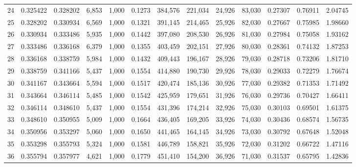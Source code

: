 \begin{tabular}{rrrrrrrrrrrrr}
24  &  0.325422 &  0.328202 &   6,853 &  1,000 &                                     0.1273 &  384,576 &  221,034 &   24,926 &   83,030 &  0.27307 &  0.76911 &  2.04745 \\
25  &  0.328202 &  0.330934 &   6,569 &  1,000 &                                     0.1321 &  391,145 &  214,465 &   25,926 &   82,030 &  0.27667 &  0.75985 &  1.98660 \\
26  &  0.330934 &  0.333486 &   5,935 &  1,000 &                                     0.1442 &  397,080 &  208,530 &   26,926 &   81,030 &  0.27984 &  0.75058 &  1.93162 \\
27  &  0.333486 &  0.336168 &   6,379 &  1,000 &                                     0.1355 &  403,459 &  202,151 &   27,926 &   80,030 &  0.28361 &  0.74132 &  1.87253 \\
28  &  0.336168 &  0.338759 &   5,984 &  1,000 &                                     0.1432 &  409,443 &  196,167 &   28,926 &   79,030 &  0.28718 &  0.73206 &  1.81710 \\
29  &  0.338759 &  0.341166 &   5,437 &  1,000 &                                     0.1554 &  414,880 &  190,730 &   29,926 &   78,030 &  0.29033 &  0.72279 &  1.76674 \\
30  &  0.341167 &  0.343664 &   5,594 &  1,000 &                                     0.1517 &  420,474 &  185,136 &   30,926 &   77,030 &  0.29382 &  0.71353 &  1.71492 \\
31  &  0.343664 &  0.346114 &   5,485 &  1,000 &                                     0.1542 &  425,959 &  179,651 &   31,926 &   76,030 &  0.29736 &  0.70427 &  1.66411 \\
32  &  0.346114 &  0.348610 &   5,437 &  1,000 &                                     0.1554 &  431,396 &  174,214 &   32,926 &   75,030 &  0.30103 &  0.69501 &  1.61375 \\
33  &  0.348610 &  0.350955 &   5,009 &  1,000 &                                     0.1664 &  436,405 &  169,205 &   33,926 &   74,030 &  0.30436 &  0.68574 &  1.56735 \\
34  &  0.350956 &  0.353297 &   5,060 &  1,000 &                                     0.1650 &  441,465 &  164,145 &   34,926 &   73,030 &  0.30792 &  0.67648 &  1.52048 \\
35  &  0.353298 &  0.355793 &   5,324 &  1,000 &                                     0.1581 &  446,789 &  158,821 &   35,926 &   72,030 &  0.31202 &  0.66722 &  1.47116 \\
36  &  0.355794 &  0.357977 &   4,621 &  1,000 &                                     0.1779 &  451,410 &  154,200 &   36,926 &   71,030 &  0.31537 &  0.65795 &  1.42836 \\

\end{tabular}
